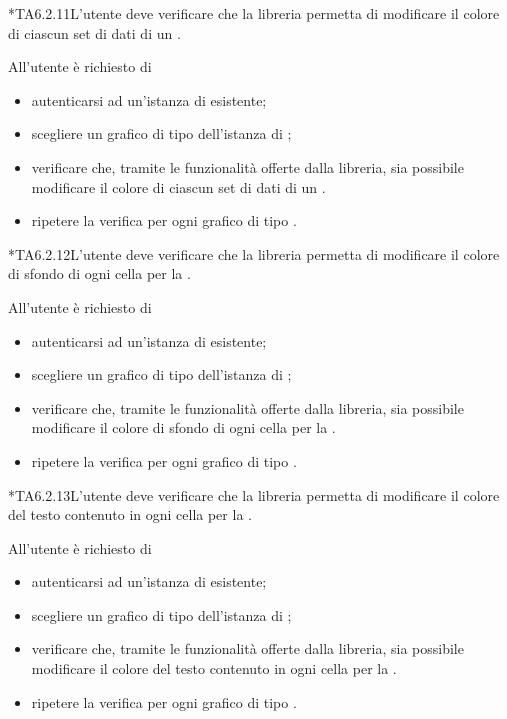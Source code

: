 	*{TA6.2.11}L'utente  deve verificare che la libreria permetta di modificare il colore di ciascun set di dati di un .
		
		All'utente  è richiesto di
		\begin{itemize}
			\item autenticarsi ad un'istanza di \projectname{} esistente;
			\item scegliere un grafico di tipo  dell'istanza di \projectname{};
			\item verificare che, tramite le funzionalità offerte dalla libreria, sia possibile modificare il colore di ciascun set di dati di un .
			\item ripetere la verifica per ogni grafico di tipo .
		\end{itemize}

	*{TA6.2.12}L'utente  deve verificare che la libreria permetta di modificare il colore di sfondo di ogni cella per la .
		
		All'utente  è richiesto di
		\begin{itemize}
			\item autenticarsi ad un'istanza di \projectname{} esistente;
			\item scegliere un grafico di tipo  dell'istanza di \projectname{};
			\item verificare che, tramite le funzionalità offerte dalla libreria, sia possibile modificare il colore di sfondo di ogni cella per la .
			\item ripetere la verifica per ogni grafico di tipo .
		\end{itemize}

	*{TA6.2.13}L'utente  deve verificare che la libreria permetta di modificare il colore del testo contenuto in ogni cella per la .
		
		All'utente  è richiesto di
		\begin{itemize}
			\item autenticarsi ad un'istanza di \projectname{} esistente;
			\item scegliere un grafico di tipo  dell'istanza di \projectname{};
			\item verificare che, tramite le funzionalità offerte dalla libreria, sia possibile modificare il colore del testo contenuto in ogni cella per la .
			\item ripetere la verifica per ogni grafico di tipo .
		\end{itemize}

